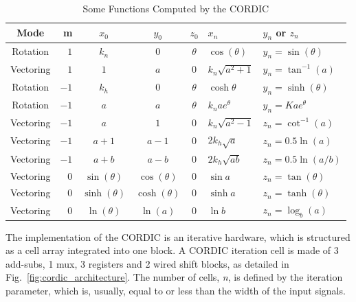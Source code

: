 \begin{table}[h]
\centering
\caption{Some Functions Computed by the CORDIC}
\label{table:cordic_func}
\begin{tabular}{crcccll}
\hline
Mode      & m  & $x_0$          & $y_0$          & $z_0$   & $x_n$                               & $y_n$ or $z_n$                           \\ \hline
Rotation  & $1 $ & $ k_n         $ & $0            $ & $ \theta $ & $ \cos(\theta)                       $ & $y_n = \sin(\theta)                   $ \\
Vectoring & $1 $ & $ 1            $ & $a            $ & $ 0      $ & $ k_n\sqrt{a^2+1} 		  $ & $ y_n = \tan^{-1}(a)$ \\
Rotation  & $-1$ & $ k_h         $ & $0            $ & $ \theta $ & $ \cosh{\theta}                    $ & $y_n = \sinh(\theta)                  $ \\
Rotation  & $-1$ & $ a            $ & $a            $ & $ \theta $ & $ k_nae^{\theta}  		  $ & $y_n = Kae^{\theta} $ \\
Vectoring & $-1$ & $ a            $ & $1            $ & $ 0      $ & $ k_n\sqrt{a^2-1} 		  $ & $z_n= \cot^{-1} (a) $ \\
Vectoring & $-1$ & $ a+1          $ & $a-1          $ & $ 0      $ & $ 2k_h\sqrt{a}                    $ & $z_n = 0.5\ln(a)                      $ \\
Vectoring & $-1$ & $ a+b          $ & $a-b          $ & $ 0      $ & $ 2k_h\sqrt{ab}                   $ & $z_n = 0.5\ln(a/b)                    $ \\
Vectoring & $0 $ & $ \sin(\theta) $ & $\cos(\theta) $ & $ 0      $ & $ \sin{a}                          $ & $z_n = \tan(\theta)                        $ \\
Vectoring & $0 $ & $ \sinh(\theta)$ & $\cosh(\theta)$ & $ 0      $ & $ \sinh{a}                         $ & $z_n = \tanh(\theta)                       $ \\
Vectoring & $0 $ & $ \ln(\theta)  $ & $\ln(a)       $ & $ 0      $ & $ \ln{b}                           $ & $z_n =  \log_b(a)                    $ \\ \hline
\end{tabular}
\end{table}



The implementation of the CORDIC is an iterative hardware, which is structured 
as a cell array integrated into one block. A CORDIC iteration cell is made of 
3 add-subs, 1 mux, 3 registers and 2 wired shift blocks, as detailed in 
Fig.~\ref{fig:cordic_architecture}. The number of cells, \textit{n}, is defined
by the iteration parameter, which is, usually, equal to or less than the width
of the input signals.

